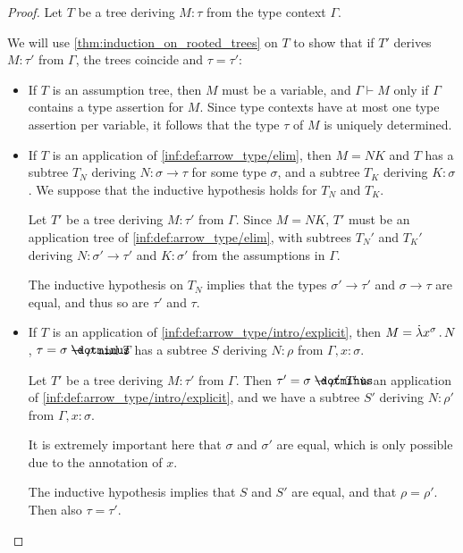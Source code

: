 \begin{proof}
  Let \( T \) be a tree deriving \( M: \tau \) from the type context \( \Gamma \).

  We will use \cref{thm:induction_on_rooted_trees} on \( T \) to show that if \( T' \) derives \( M: \tau' \) from \( \Gamma \), the trees coincide and \( \tau = \tau' \):
  \begin{itemize}
    \item If \( T \) is an assumption tree, then \( M \) must be a variable, and \( \Gamma \vdash M \) only if \( \Gamma \) contains a type assertion for \( M \). Since type contexts have at most one type assertion per variable, it follows that the type \( \tau \) of \( M \) is uniquely determined.

    \item If \( T \) is an application of \ref{inf:def:arrow_type/elim}, then \( M = NK \) and \( T \) has a subtree \( T_N \) deriving \( N: \sigma \to \tau \) for some type \( \sigma \), and a subtree \( T_K \) deriving \( K: \sigma \). We suppose that the inductive hypothesis holds for \( T_N \) and \( T_K \).

    Let \( T' \) be a tree deriving \( M: \tau' \) from \( \Gamma \). Since \( M = NK \), \( T' \) must be an application tree of \ref{inf:def:arrow_type/elim}, with subtrees \( T_N' \) and \( T_K' \) deriving \( N: \sigma' \to \tau' \) and \( K: \sigma' \) from the assumptions in \( \Gamma \).

    The inductive hypothesis on \( T_N \) implies that the types \( \sigma' \to \tau' \) and \( \sigma \to \tau \) are equal, and thus so are \( \tau' \) and \( \tau \).

    \item If \( T \) is an application of \ref{inf:def:arrow_type/intro/explicit}, then \( M = \qabs {x^\sigma} N \), \( \tau = \sigma \synimplies \rho \) and \( T \) has a subtree \( S \) deriving \( N: \rho \) from \( \Gamma, x: \sigma \).

    Let \( T' \) be a tree deriving \( M: \tau' \) from \( \Gamma \). Then \( \tau' = \sigma \synimplies \rho' \) \( T' \) is an application of \ref{inf:def:arrow_type/intro/explicit}, and we have a subtree \( S' \) deriving \( N: \rho' \) from \( \Gamma, x: \sigma \).

    It is extremely important here that \( \sigma \) and \( \sigma' \) are equal, which is only possible due to the annotation of \( x \).

    The inductive hypothesis implies that \( S \) and \( S' \) are equal, and that \( \rho = \rho' \). Then also \( \tau = \tau' \).
  \end{itemize}
\end{proof}

